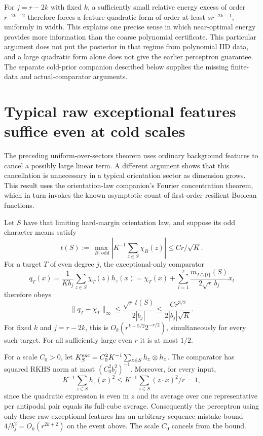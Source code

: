 \documentclass[11pt]{article}
\begin{document}
For $j=r-2k$ with fixed $k$, a sufficiently small relative energy
excess of order $r^{-2k-2}$ therefore forces a feature quadratic form
of order at least $s r^{-2k-1}$, uniformly in width. This explains
one precise sense in which near-optimal energy provides more information
than the coarse polynomial certificate. This particular argument does
not put the posterior in that regime from polynomial IID data, and a
large quadratic form alone does not give the earlier perceptron guarantee.
The separate cold-prior companion described below supplies the missing
finite-data and actual-comparator arguments.

\section{Typical raw exceptional features suffice even at cold scales}
The preceding uniform-over-sectors theorem uses ordinary background
features to cancel a possibly large linear term. A different argument
shows that this cancellation is unnecessary in a typical orientation
sector as dimension grows. This result uses the orientation-law
companion's Fourier concentration theorem, which in turn invokes the
known asymptotic count of first-order resilient Boolean functions.

Let $S$ have that limiting hard-margin orientation law, and suppose its
odd character means satisfy
\[
 t(S):=\max_{|B|\text{ odd}}\left|K^{-1}\sum_{z\in S}\chi_B(z)\right|
                                      \le Cr/\sqrt K.
\]
For a target $T$ of even degree $j$, the exceptional-only comparator
\[
 q_T(x)=\frac1{K b_j}\sum_{z\in S}\chi_T(z)h_z(x)
       =\chi_T(x)+\sum_{l=1}^r
                   \frac{m_{T\triangle\{l\}}(S)}{2\sqrt r\,b_j}x_l
\]
therefore obeys
\[
 \|q_T-\chi_T\|_\infty
 \le\frac{\sqrt r\,t(S)}{2|b_j|}
 \le\frac{Cr^{3/2}}{2|b_j|\sqrt K}.                   \tag{8}
\]
For fixed $k$ and $j=r-2k$, this is
$O_k(r^{k+5/2}2^{-r/2})$, simultaneously for every such target.
For all sufficiently large even $r$ it is at most $1/2$.

For a scale $C_0>0$, let
$K_S^{\rm exc}=C_0^2K^{-1}\sum_{z\in S}h_z\otimes h_z$.
The comparator has squared RKHS norm at most $(C_0^2b_j^2)^{-1}$.
Moreover, for every input,
\[
 K^{-1}\sum_{z\in S}h_z(x)^2
 \le K^{-1}\sum_{z\in S}(z\cdot x)^2/r=1,
\]
since the quadratic expression is even in $z$ and its average over one
representative per antipodal pair equals its full-cube average.
Consequently the perceptron using only these raw exceptional features
has an arbitrary-sequence mistake bound $4/b_j^2=O_k(r^{2k+2})$
on the event above. The scale $C_0$ cancels from the bound.
\end{document}
